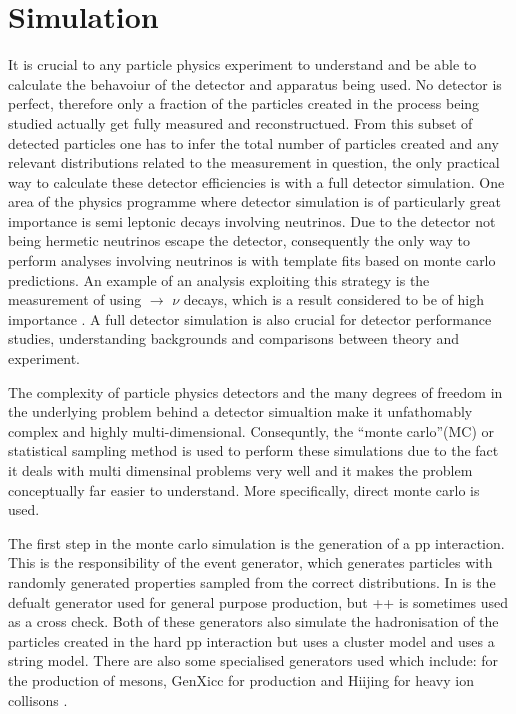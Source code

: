 
\section{Simulation}
\label{sec:Simulation}
It is crucial to any particle physics experiment to understand and be able to calculate the behavoiur of the detector and apparatus being used.  No detector is perfect, therefore only a fraction of the particles created in the process being studied actually get fully measured and reconstructued.  From this subset of detected particles one has to infer the total number of particles created and any relevant distributions related to the measurement in question, the only practical way to calculate these detector efficiencies is with a full detector simulation.  One area of the \lhcb physics programme where detector simulation is of particularly great importance is semi leptonic decays involving neutrinos.  Due to the \lhcb detector not being hermetic neutrinos escape the detector, consequently the only way to perform analyses involving neutrinos is with template fits based on monte carlo predictions.  An example of an analysis exploiting this strategy is the measurement of \Vub using \Lb $\rightarrow$ \proton \muon $\nu$ decays, which is a result considered to be of high importance \cite{LHCb-PAPER-2015-013}.  A full detector simulation is also crucial for detector performance studies, understanding backgrounds and comparisons between theory and experiment.

The complexity of particle physics detectors and the many degrees of freedom in the underlying problem behind a detector simualtion make it unfathomably complex and highly multi-dimensional.  Consequntly, the ``monte carlo''(MC) or statistical sampling method is used to perform these simulations due to the fact it deals with multi dimensinal problems very well and it makes the problem conceptually far easier to understand.  More specifically, direct monte carlo is used.

The first step in the monte carlo simulation is the generation of a pp interaction.  This is the responsibility of the event generator, which generates particles with randomly generated properties sampled from the correct distributions.  In \lhcb \pythia is the defualt generator used for general purpose production, but \herwig++ is sometimes used as a cross check\cite{Sjostrand:2007gs,Herwig}.  Both of these generators also simulate the hadronisation of the particles created in the hard pp interaction but \herwig uses a cluster model and \pythia uses a string model.  There are also some specialised generators used which include: \bcvegpy for the production of \Bc mesons, GenXicc for \Xic production and Hiijing for heavy ion collisons \cite{bcvegpy,Gyulassy:1994ew,Chang:2007pp}.

